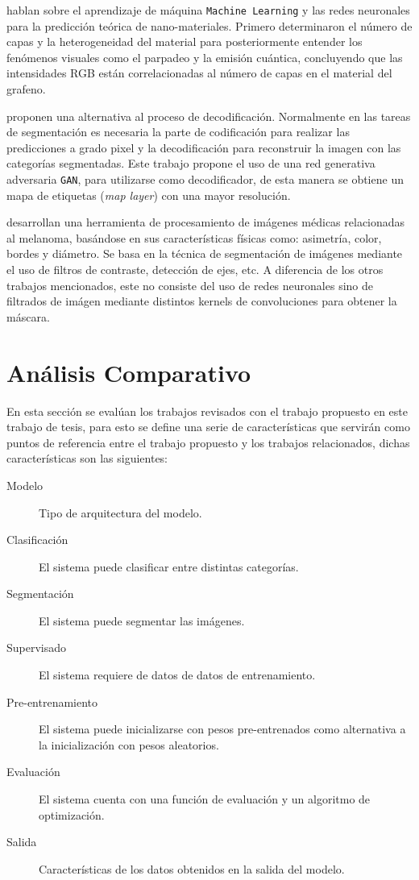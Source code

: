 \citet{zhou2019emerging} hablan sobre el aprendizaje de máquina \texttt{Machine Learning} y las redes neuronales para la predicción teórica de nano-materiales. Primero determinaron el número de capas y la heterogeneidad del material para posteriormente entender los fenómenos visuales como el parpadeo y la emisión cuántica, concluyendo que las intensidades RGB están correlacionadas al número de capas en el material del grafeno. 

\citet{DBLP:journals/corr/LucCCV16} proponen una alternativa al proceso de decodificación. Normalmente en las tareas de segmentación es necesaria la parte de codificación para realizar las predicciones a grado pixel y la decodificación para reconstruir la imagen con las categorías segmentadas. Este trabajo propone el uso de una red generativa adversaria \texttt{GAN}, para utilizarse como decodificador, de esta manera se obtiene un mapa de etiquetas (\emph{map layer}) con una mayor resolución.

\citet{JAIN2015735} desarrollan una herramienta de procesamiento de imágenes médicas relacionadas al melanoma, basándose en sus características físicas como: asimetría, color, bordes y diámetro. Se basa en la técnica de segmentación de imágenes mediante el uso de filtros de contraste, detección de ejes, etc. A diferencia de los otros trabajos mencionados, este no consiste del uso de redes neuronales sino de filtrados de imágen mediante distintos kernels de convoluciones para obtener la máscara.

\section{Análisis Comparativo}
En esta sección se evalúan los trabajos revisados con el trabajo propuesto en este trabajo de tesis, para esto se define una serie de características que servirán como puntos de referencia entre el trabajo propuesto y los trabajos relacionados, dichas características son las siguientes:

\begin{description}
    \item[Modelo]{Tipo de arquitectura del modelo.}
    \item[Clasificación]{El sistema puede clasificar entre distintas categorías.}
    \item[Segmentación]{El sistema puede segmentar las imágenes.}
    \item[Supervisado]{ El sistema requiere de datos de datos de entrenamiento.}
    \item[Pre-entrenamiento]{El sistema puede inicializarse con pesos pre-entrenados como alternativa a la inicialización con pesos aleatorios.}
    \item[Evaluación]{El sistema cuenta con una función de evaluación y un algoritmo de optimización.}
    \item[Salida]{Características de los datos obtenidos en la salida del modelo.}
\end{description}

